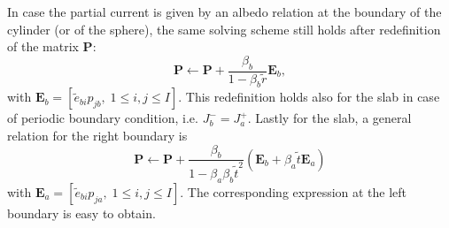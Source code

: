 \documentclass{ictt26}
\begin{document}
In case the partial current is given by an albedo relation at the boundary of the cylinder (or of the sphere), the same solving scheme still holds after redefinition of the matrix $\mathbf{P}$:
\[
\mathbf{P} \leftarrow \mathbf{P} + \frac{\beta_b}{1 - \beta_b \tilde{r}} \mathbf{E}_b,
\]
with $\mathbf{E}_b = [\tilde{e}_{bi} p_{jb},\; 1 \leq i,j \leq I]$. This redefinition holds also for the slab in case of periodic boundary condition, i.e. $J_b^- = J_a^+$. Lastly for the slab, a general relation for the right boundary is
\[ \mathbf{P} \leftarrow \mathbf{P} + 
\frac{\beta_b}{1 - \beta_a \beta_b \tilde{t}^2}
\left( \mathbf{E}_b + \beta_a \tilde{t} \mathbf{E}_a \right)
\]
with $\mathbf{E}_a = [\tilde{e}_{bi} p_{ja},\; 1 \leq i,j \leq I]$. The corresponding expression at the left boundary is easy to obtain.

\setlength{\baselineskip}{12pt}


\end{document}
